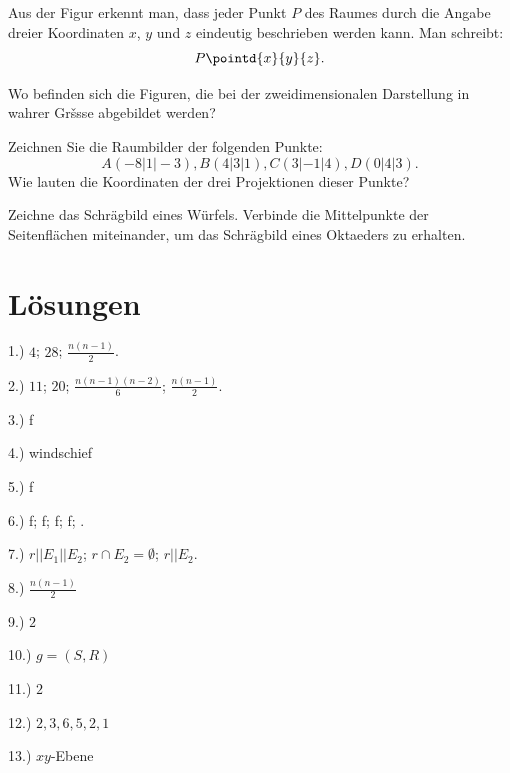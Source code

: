 \documentclass[%
11pt,%
twoside,%
titlepage,%
a4page,%
german,%
headsepline%
]{scrartcl}
\begin{document}
Aus der Figur erkennt man, dass jeder Punkt $P$ des Raumes durch die Angabe dreier Koordinaten $x$, $y$ und $z$ eindeutig beschrieben werden kann. Man schreibt:
$$P\pointd{x}{y}{z}.$$

\begin{ueb}
Wo befinden sich die Figuren, die bei der zweidimensionalen Darstellung in wahrer Gršsse abgebildet werden?
\end{ueb}
\begin{ueb}
Zeichnen Sie die Raumbilder der folgenden Punkte:
$$A(-8|1|-3), B(4|3|1), C(3|-1|4), D(0|4|3).$$ Wie lauten die Koordinaten der drei Projektionen dieser Punkte?
\end{ueb}

\begin{ueb}
Zeichne das Schr\"agbild eines W\"urfels. Verbinde die Mittelpunkte der Seitenfl\"achen miteinander, um das Schr\"agbild eines Oktaeders zu erhalten.
\end{ueb}

\section*{L\"osungen}

1.) $4$; $28$; $\frac{n(n-1)}{2}$.

2.) $11$; $20$; $\frac{n(n-1)(n-2)}{6}$; $\frac{n(n-1)}{2}$.

3.) f

4.) windschief

5.) f

6.) f; f; f; f; \checkmark.

7.) $r||E_1||E_2$; $r\cap E_2=\emptyset$; $r||E_2$.

8.) $\frac{n(n-1)}{2}$

9.) $2$

10.) $g=(S,R)$

11.) $2$

12.) $2,3,6,5,2,1$

13.) $xy$-Ebene

\clearpage
\end{document}
